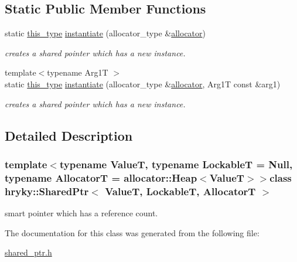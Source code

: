 \subsection*{Static Public Member Functions}
\begin{DoxyCompactItemize}
\item 
\hypertarget{classhryky_1_1_shared_ptr_a51f756b899403aa6c8a182bb5bbfd6a8}{static \hyperlink{classhryky_1_1_shared_ptr_a0fa551b79990485506c88137044ec4b8}{this\-\_\-type} \hyperlink{classhryky_1_1_shared_ptr_a51f756b899403aa6c8a182bb5bbfd6a8}{instantiate} (allocator\-\_\-type \&\hyperlink{classhryky_1_1_shared_ptr_a6238460a4d882766f62458ad727f7bb4}{allocator})}\label{classhryky_1_1_shared_ptr_a51f756b899403aa6c8a182bb5bbfd6a8}

\begin{DoxyCompactList}\small\item\em creates a shared pointer which has a new instance. \end{DoxyCompactList}\item 
\hypertarget{classhryky_1_1_shared_ptr_a74208f1d0f90c51593b6d811934d65de}{{\footnotesize template$<$typename Arg1\-T $>$ }\\static \hyperlink{classhryky_1_1_shared_ptr_a0fa551b79990485506c88137044ec4b8}{this\-\_\-type} \hyperlink{classhryky_1_1_shared_ptr_a74208f1d0f90c51593b6d811934d65de}{instantiate} (allocator\-\_\-type \&\hyperlink{classhryky_1_1_shared_ptr_a6238460a4d882766f62458ad727f7bb4}{allocator}, Arg1\-T const \&arg1)}\label{classhryky_1_1_shared_ptr_a74208f1d0f90c51593b6d811934d65de}

\begin{DoxyCompactList}\small\item\em creates a shared pointer which has a new instance. \end{DoxyCompactList}\end{DoxyCompactItemize}


\subsection{Detailed Description}
\subsubsection*{template$<$typename Value\-T, typename Lockable\-T = Null, typename Allocator\-T = allocator\-::\-Heap$<$\-Value\-T$>$$>$class hryky\-::\-Shared\-Ptr$<$ Value\-T, Lockable\-T, Allocator\-T $>$}

smart pointer which has a reference count. 

The documentation for this class was generated from the following file\-:\begin{DoxyCompactItemize}
\item 
\hyperlink{shared__ptr_8h}{shared\-\_\-ptr.\-h}\end{DoxyCompactItemize}
